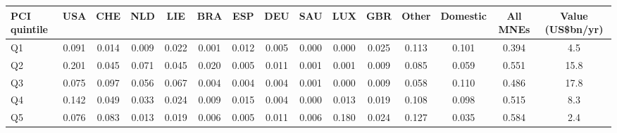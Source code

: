 \begin{tabular}{lcccccccccccccc}
\toprule
PCI quintile & USA & CHE & NLD & LIE & BRA & ESP & DEU & SAU & LUX & GBR & Other & Domestic & All MNEs & Value (US\$bn/yr) \\
\midrule
Q1 & 0.091 & 0.014 & 0.009 & 0.022 & 0.001 & 0.012 & 0.005 & 0.000 & 0.000 & 0.025 & 0.113 & 0.101 & 0.394 & 4.5 \\
Q2 & 0.201 & 0.045 & 0.071 & 0.045 & 0.020 & 0.005 & 0.011 & 0.001 & 0.001 & 0.009 & 0.085 & 0.059 & 0.551 & 15.8 \\
Q3 & 0.075 & 0.097 & 0.056 & 0.067 & 0.004 & 0.004 & 0.004 & 0.001 & 0.000 & 0.009 & 0.058 & 0.110 & 0.486 & 17.8 \\
Q4 & 0.142 & 0.049 & 0.033 & 0.024 & 0.009 & 0.015 & 0.004 & 0.000 & 0.013 & 0.019 & 0.108 & 0.098 & 0.515 & 8.3 \\
Q5 & 0.076 & 0.083 & 0.013 & 0.019 & 0.006 & 0.005 & 0.011 & 0.006 & 0.180 & 0.024 & 0.127 & 0.035 & 0.584 & 2.4 \\
\bottomrule
\end{tabular}
